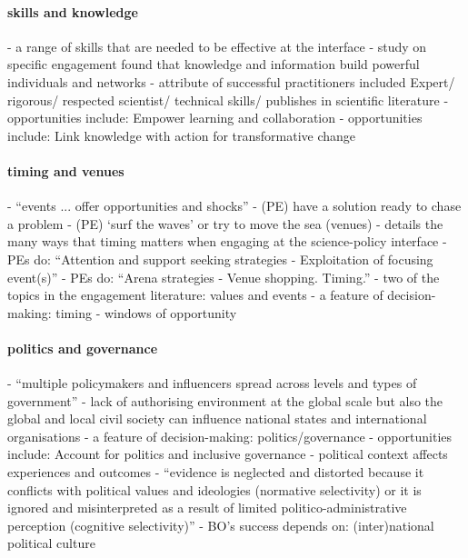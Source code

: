  \paragraph{skills and knowledge}
\cite{BednarekSHG2015,Mintrom2019} - a range of skills that are needed to be effective at the interface
\cite{Braun2009} - study on specific engagement found that knowledge and information build powerful individuals and networks
\cite{GogginEtAl2015} - attribute of successful practitioners included Expert/ rigorous/ respected scientist/ technical skills/ publishes in scientific literature
\cite{MoallemiZHSMZHKHMGLB2023} - opportunities include: Empower learning and collaboration
\cite{MoallemiZHSMZHKHMGLB2023} - opportunities include: Link knowledge with action for transformative change
\paragraph{timing and venues}
\cite{CairneyW2017} - ``events ... offer opportunities and shocks''
\cite{Cairney2018} - (PE) have a solution ready to chase a problem
\cite{Cairney2018} - (PE) `surf the waves' or try to move the sea (venues)
\cite{GluckmanBK2021} - details the many ways that timing matters when engaging at the science-policy interface
\cite{vonMalmborg2024strategies} - PEs do: ``Attention and support seeking strategies - Exploitation of focusing event(s)''
\cite{vonMalmborg2024strategies} - PEs do: ``Arena strategies - Venue shopping. Timing.''
\cite{CairneyO2020} - two of the topics in the engagement literature: values and events
\cite{MoallemiZHSMZHKHMGLB2023} - a feature of decision-making: timing
\cite{ThompsonD2024} - windows of opportunity
 \paragraph{politics and governance}
\cite{CairneyW2017} - ``multiple policymakers and influencers spread across levels and types of government''
\cite{GeuijenMCRv2017} - lack of authorising environment at the global scale but also the global and local civil society can influence national states and international organisations
\cite{MoallemiZHSMZHKHMGLB2023} - a feature of decision-making: politics/governance
\cite{MoallemiZHSMZHKHMGLB2023} - opportunities include: Account for politics and inclusive governance
\cite{SaxonbergSL2023} - political context affects experiences and outcomes
\cite{StrassheimK2014} - ``evidence is neglected and distorted because it conflicts with political values and ideologies (normative selectivity) or it is ignored and misinterpreted as a result of limited politico-administrative perception (cognitive selectivity)''
\cite{WesselinkH2020} - BO's success depends on: (inter)national political culture 

